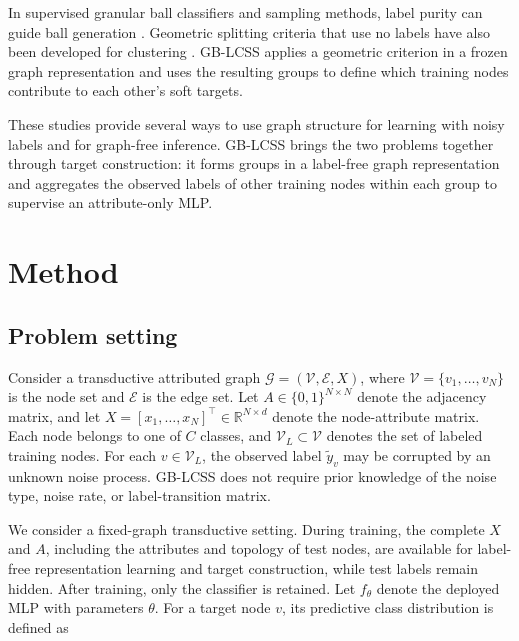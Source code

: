 \documentclass[10pt,letterpaper,nopreprintline]{elsarticle}
\theoremstyle{plain}
\begin{document}
In supervised granular ball classifiers and sampling methods, label purity can guide ball generation \cite{ref13,ref15,ref16}. Geometric splitting criteria that use no labels have also been developed for clustering \cite{ref14}. GB-LCSS applies a geometric criterion in a frozen graph representation and uses the resulting groups to define which training nodes contribute to each other's soft targets.

These studies provide several ways to use graph structure for learning with noisy labels and for graph-free inference. GB-LCSS brings the two problems together through target construction: it forms groups in a label-free graph representation and aggregates the observed labels of other training nodes within each group to supervise an attribute-only MLP.

\FloatBarrier

\section{Method}\label{sec:3}

\subsection{Problem setting}\label{sec:3.1}

Consider a transductive attributed graph \(\mathcal{G} = \left( \mathcal{V},\mathcal{E},X \right)\), where \(\mathcal{V} = \{ v_{1},\ldots,v_{N}\}\) is the node set and \(\mathcal{E}\) is the edge set. Let \(A \in \{ 0,1\}^{N \times N}\) denote the adjacency matrix, and let \(X = \left\lbrack x_{1},\ldots,x_{N} \right\rbrack^{\top} \in \mathbb{R}^{N \times d}\) denote the node-attribute matrix. Each node belongs to one of \(C\) classes, and \(\mathcal{V}_{L} \subset \mathcal{V}\) denotes the set of labeled training nodes. For each \(v \in \mathcal{V}_{L}\), the observed label \({\widetilde{y}}_{v}\) may be corrupted by an unknown noise process. GB-LCSS does not require prior knowledge of the noise type, noise rate, or label-transition matrix.

\Needspace{64pt}

We consider a fixed-graph transductive setting. During training, the complete \(X\) and \(A\), including the attributes and topology of test nodes, are available for label-free representation learning and target construction, while test labels remain hidden. After training, only the classifier is retained. Let \(f_{\theta}\) denote the deployed MLP with parameters \(\theta\). For a target node \(v\), its predictive class distribution is defined as
\end{document}
